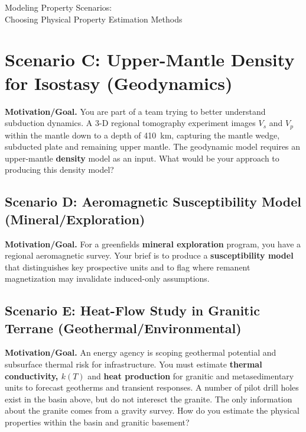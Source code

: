 \begin{activity}{Modeling Property Scenarios:\\Choosing Physical Property Estimation Methods}
\yourplan{}

\newpage
\section*{Scenario C: Upper-Mantle Density for Isostasy (Geodynamics)}
\noindent\textbf{Motivation/Goal.} You are part of a team trying to better understand subduction dynamics.  A 3-D regional tomography experiment images $V_s$ and $V_p$ within the mantle down to a depth of 410~km, capturing the mantle wedge, subducted plate and remaining upper mantle.  The geodynamic model requires an upper-mantle \textbf{density} model as an input.  What would be your approach to producing this density model?

\yourplan{}

\newpage
\subsection*{Scenario D: Aeromagnetic Susceptibility Model (Mineral/Exploration)}
\noindent\textbf{Motivation/Goal.} For a greenfields \textbf{mineral exploration} program, you have a regional aeromagnetic survey. Your brief is to produce a \textbf{susceptibility model} that distinguishes key prospective units and to flag where remanent magnetization may invalidate induced-only assumptions.

\yourplan{}

\newpage
\subsection*{Scenario E: Heat-Flow Study in Granitic Terrane (Geothermal/Environmental)}
\noindent\textbf{Motivation/Goal.} An energy agency is scoping geothermal potential and subsurface thermal risk for infrastructure. You must estimate \textbf{thermal conductivity, $k(T)$} and \textbf{heat production} for granitic and metasedimentary units to forecast geotherms and transient responses.  A number of pilot drill holes exist in the basin above, but do not interesct the granite.  The only information about the granite comes from a gravity survey.  How do you estimate the physical properties within the basin and granitic basement?

\yourplan{}

\newpage

\end{activity}
